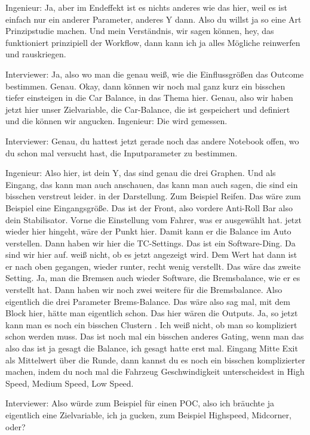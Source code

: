 Ingenieur:
Ja, aber im Endeffekt ist es nichts anderes wie das hier, weil es ist einfach nur ein anderer Parameter, anderes Y dann. Also du willst ja so eine Art Prinzipstudie machen. Und mein Verständnis, wir sagen können, hey, das funktioniert prinzipiell der Workflow, dann kann ich ja alles Mögliche reinwerfen und rauskriegen. 

Interviewer:
Ja, also wo man die genau weiß, wie die Einflussgrößen das Outcome  bestimmen. Genau. Okay, dann können wir noch mal ganz kurz ein bisschen tiefer einsteigen in die Car Balance, in das Thema hier. Genau, also wir haben jetzt hier unser Zielvariable, die Car-Balance, die ist gespeichert und definiert und die können wir angucken. 
Ingenieur:
Die wird gemessen.

Interviewer:
Genau, du hattest jetzt gerade noch das andere Notebook offen, wo du schon mal versucht hast, die Inputparameter zu bestimmen.

Ingenieur:
Also hier, ist dein Y, das sind genau die drei Graphen.  Und als Eingang, das kann man auch anschauen, das kann man auch sagen, die sind ein bisschen verstreut leider. in der Darstellung. Zum Beispiel Reifen.   Das wäre zum Beispiel eine Eingangsgröße. Das ist der Front, also vordere Anti-Roll Bar also dein Stabilisator. Vorne die Einstellung vom Fahrer, was er ausgewählt hat. jetzt wieder hier hingeht, wäre der Punkt hier. Damit kann er die Balance im Auto verstellen. Dann haben wir hier die TC-Settings.  Das ist ein Software-Ding. Da sind wir hier auf. weiß nicht, ob es jetzt angezeigt wird. Dem Wert hat dann ist er nach oben gegangen, wieder runter, recht wenig verstellt. Das wäre das zweite Setting. Ja, man die Bremsen auch wieder Software, die Bremsbalance, wie er es verstellt hat. Dann haben wir noch zwei weitere für die Bremsbalance. Also eigentlich die drei Parameter Brems-Balance. Das wäre also sag mal, mit dem Block hier, hätte man eigentlich schon. Das hier wären die Outputs. Ja, so jetzt kann man es noch ein bisschen Clustern . Ich weiß nicht, ob man so kompliziert schon werden muss. Das ist noch mal ein bisschen anderes Gating, wenn man das also das ist ja gesagt die Balance, ich gesagt hatte erst mal. Eingang Mitte Exit als Mittelwert über die Runde, dann kannst du es noch ein bisschen komplizierter machen, indem du noch mal die Fahrzeug Geschwindigkeit unterscheidest in High Speed, Medium Speed, Low Speed.  

Interviewer:
Also würde zum Beispiel für einen POC, also ich bräuchte ja eigentlich eine Zielvariable, ich ja gucken, zum Beispiel Highspeed, Midcorner, oder? 


